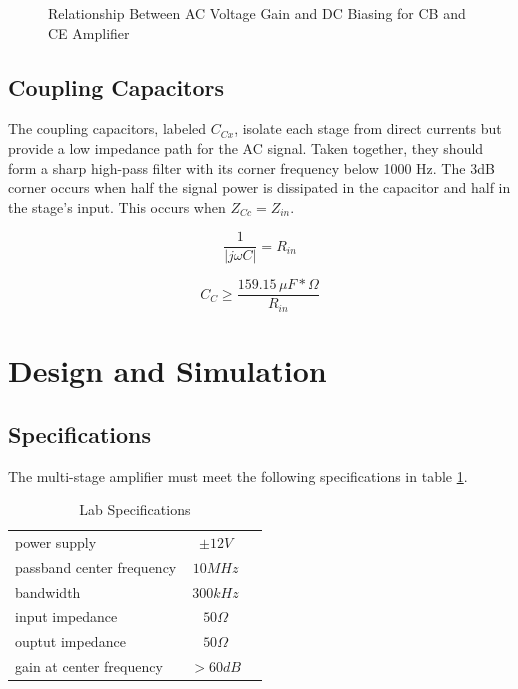 \documentclass[titlepage, letterpaper, 11pt]{article}
\begin{document}
\begin{figure}[ht]
	\centering

	\caption{
		Relationship Between AC Voltage Gain and DC Biasing
		for CB and CE Amplifier
	}
	\label{gainQptRelation}
\end{figure}


\subsection{Coupling Capacitors}

The coupling capacitors, labeled $C_{Cx}$, isolate each stage from
direct currents but provide a low impedance path for the AC signal.
Taken together, they should form a sharp high-pass filter with its
corner frequency below 1000 Hz. The 3dB corner occurs when half the
signal power is dissipated in the capacitor and half in the stage's
input. This occurs when $Z_{Cc}=Z_{in}$.

\begin{equation*}
\frac{1}{|j\omega C|}=R_{in}
\end{equation*}

\begin{equation}
C_{C}\geq \frac{159.15\,\mu F*\Omega}{R_{in}}
\label{couplingCapacitors}
\end{equation}

\section{Design and Simulation}

\subsection{Specifications}

The multi-stage amplifier must meet the following specifications in
table \ref{labSpecs}.

\begin{table}[ht]
\centering
\caption{Lab Specifications}
\begin{tabular}{l c c}
\hline
power supply			&$\pm 12V$	\\
passband center frequency	&$10MHz$	\\
bandwidth			&$300kHz$	\\
input impedance			&$50\Omega$	\\
ouptut impedance		&$50\Omega$	\\
gain at center frequency	&$>60dB$	\\
\hline
\end{tabular}
\label{labSpecs}
\end{table}
\end{document}
